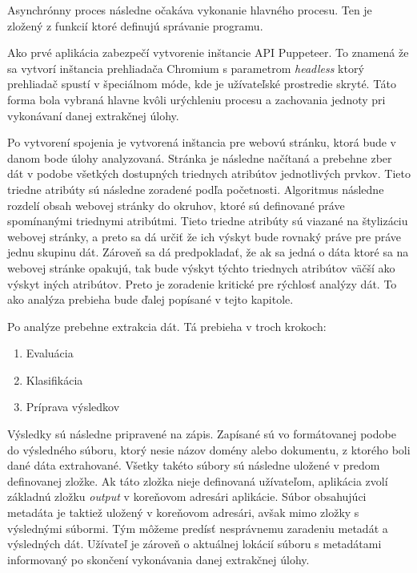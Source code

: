  Asynchrónny proces následne očakáva vykonanie hlavného procesu. Ten je zložený z funkcií ktoré definujú správanie programu. 
 
 Ako prvé aplikácia zabezpečí vytvorenie inštancie API Puppeteer. To znamená že sa vytvorí inštancia prehliadača Chromium s parametrom \textit{headless} ktorý prehliadač spustí v špeciálnom móde, kde je užívateľské prostredie skryté. Táto forma bola vybraná hlavne kvôli urýchleniu procesu a zachovania jednoty pri vykonávaní danej extrakčnej úlohy. 
 
 Po vytvorení spojenia je vytvorená inštancia pre webovú stránku, ktorá bude v danom bode úlohy analyzovaná. Stránka je následne načítaná a prebehne zber dát v podobe všetkých dostupných triednych atribútov jednotlivých prvkov. Tieto triedne atribúty sú následne zoradené podľa početnosti. Algoritmus následne rozdelí obsah webovej stránky do okruhov, ktoré sú definované práve spomínanými triednymi atribútmi. Tieto triedne atribúty sú viazané na štylizáciu webovej stránky, a preto sa dá určiť že ich výskyt bude rovnaký práve pre práve jednu skupinu dát. Zároveň sa dá predpokladať, že ak sa jedná o dáta ktoré sa na webovej stránke opakujú, tak bude výskyt týchto triednych atribútov väčší ako výskyt iných atribútov. Preto je zoradenie kritické pre rýchlosť analýzy dát. To ako analýza prebieha bude ďalej popísané v tejto kapitole.
 
 Po analýze prebehne extrakcia dát. Tá prebieha v troch krokoch:
 
 \begin{enumerate}
     \item Evaluácia
     \item Klasifikácia
     \item Príprava výsledkov
 \end{enumerate}
 
 \bigskip
 
 Výsledky sú následne pripravené na zápis. Zapísané sú vo formátovanej podobe do výsledného súboru, ktorý nesie názov domény alebo dokumentu, z ktorého boli dané dáta extrahované. Všetky takéto súbory sú následne uložené v predom definovanej zložke. Ak táto zložka nieje definovaná užívateľom, aplikácia zvolí základnú zložku \textit{output} v koreňovom adresári aplikácie. Súbor obsahujúci metadáta je taktiež uložený v koreňovom adresári, avšak mimo zložky s výslednými súbormi. Tým môžeme predísť nesprávnemu zaradeniu metadát a výsledných dát. Užívateľ je zároveň o aktuálnej lokácií súboru s metadátami informovaný po skončení vykonávania danej extrakčnej úlohy.
 
